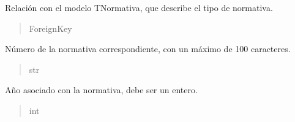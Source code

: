 \documentclass[letterpaper,10pt,spanish]{sphinxmanual}
\begin{document}
\begin{fulllineitems}
\begin{fulllineitems}
\begin{quote}
\begin{description}
\end{description}\end{quote}

\end{fulllineitems}



\begin{fulllineitems}

\pysigstartsignatures
{}
\pysigstopsignatures
\sphinxAtStartPar
Relación con el modelo TNormativa, que describe el tipo de normativa.
\begin{quote}\begin{description}
\sphinxAtStartPar
ForeignKey

\end{description}\end{quote}

\end{fulllineitems}



\begin{fulllineitems}

\pysigstartsignatures
{}
\pysigstopsignatures
\sphinxAtStartPar
Número de la normativa correspondiente, con un máximo de 100 caracteres.
\begin{quote}\begin{description}
\sphinxAtStartPar
str

\end{description}\end{quote}

\end{fulllineitems}



\begin{fulllineitems}

\pysigstartsignatures
{}
\pysigstopsignatures
\sphinxAtStartPar
Año asociado con la normativa, debe ser un entero.
\begin{quote}\begin{description}
\sphinxAtStartPar
int

\end{description}\end{quote}

\end{fulllineitems}




\end{fulllineitems}
\end{document}
